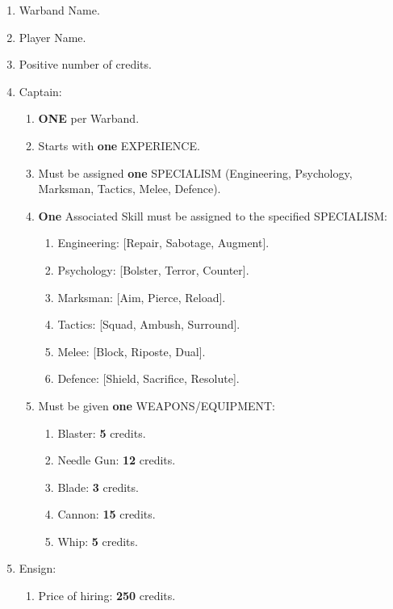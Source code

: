\documentclass[12pt,a4paper]{article}
\begin{document}
\begin{enumerate}
 \item Warband Name.
 \item Player Name.
 \item Positive number of credits.
 \item Captain: \begin{enumerate}
                 \item \textbf{ONE} per Warband.
                 \item Starts with \textbf{one} EXPERIENCE.
                 \item Must be assigned \textbf{one} SPECIALISM (Engineering, Psychology, Marksman, Tactics, Melee, Defence).
                 \item \textbf{One} Associated Skill must be assigned to the specified SPECIALISM: \begin{enumerate}
							  \item Engineering: [Repair, Sabotage, Augment].
							  \item Psychology: [Bolster, Terror, Counter].
							  \item Marksman: [Aim, Pierce, Reload].
							  \item Tactics: [Squad, Ambush, Surround].
							  \item Melee: [Block, Riposte, Dual].
							  \item Defence: [Shield, Sacrifice, Resolute].
							 \end{enumerate}
				 \item Must be given \textbf{one} WEAPONS/EQUIPMENT: \begin{enumerate}
				                                         \item Blaster: \textbf{5} credits.
				                                         \item Needle Gun: \textbf{12} credits.
				                                         \item Blade: \textbf{3} credits.
				                                         \item Cannon: \textbf{15} credits.
				                                         \item Whip: \textbf{5} credits.
				                                        \end{enumerate}
                \end{enumerate}
 \item Ensign: \begin{enumerate}
                \item Price of hiring: \textbf{250} credits.

\end{enumerate}
\end{enumerate}
\end{document}
